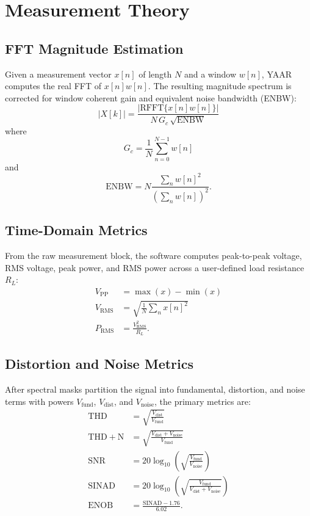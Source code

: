 \documentclass[conference]{IEEEtran}
\begin{document}
\section{Measurement Theory}
\subsection{FFT Magnitude Estimation}
Given a measurement vector $x[n]$ of length $N$ and a window $w[n]$, YAAR computes the real FFT of $x[n]w[n]$. The resulting magnitude spectrum is corrected for window coherent gain and equivalent noise bandwidth (ENBW):
\begin{equation}
|X[k]| = \frac{|\mathrm{RFFT}\{x[n]w[n]\}|}{N\,G_c\,\sqrt{\mathrm{ENBW}}}
\end{equation}
where
\begin{equation}
G_c = \frac{1}{N}\sum_{n=0}^{N-1} w[n]
\end{equation}
and
\begin{equation}
\mathrm{ENBW} = N\frac{\sum_n w[n]^2}{\left(\sum_n w[n]\right)^2}.
\end{equation}

\subsection{Time-Domain Metrics}
From the raw measurement block, the software computes peak-to-peak voltage, RMS voltage, peak power, and RMS power across a user-defined load resistance $R_L$:
\begin{align}
V_{\mathrm{PP}} &= \max(x)-\min(x) \\
V_{\mathrm{RMS}} &= \sqrt{\frac{1}{N}\sum_n x[n]^2} \\
P_{\mathrm{RMS}} &= \frac{V_{\mathrm{RMS}}^2}{R_L}.
\end{align}

\subsection{Distortion and Noise Metrics}
After spectral masks partition the signal into fundamental, distortion, and noise terms with powers $V_{\mathrm{fund}}$, $V_{\mathrm{dist}}$, and $V_{\mathrm{noise}}$, the primary metrics are:
\begin{align}
\mathrm{THD} &= \sqrt{\frac{V_{\mathrm{dist}}}{V_{\mathrm{fund}}}} \\
\mathrm{THD+N} &= \sqrt{\frac{V_{\mathrm{dist}}+V_{\mathrm{noise}}}{V_{\mathrm{fund}}}} \\
\mathrm{SNR} &= 20\log_{10}\left(\sqrt{\frac{V_{\mathrm{fund}}}{V_{\mathrm{noise}}}}\right) \\
\mathrm{SINAD} &= 20\log_{10}\left(\sqrt{\frac{V_{\mathrm{fund}}}{V_{\mathrm{dist}}+V_{\mathrm{noise}}}}\right) \\
\mathrm{ENOB} &= \frac{\mathrm{SINAD}-1.76}{6.02}.
\end{align}
\end{document}
